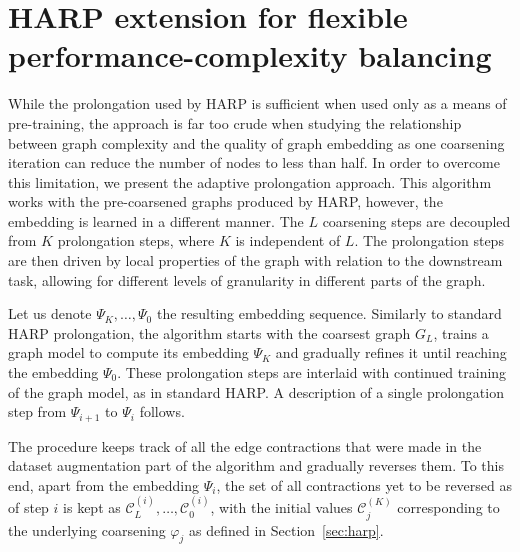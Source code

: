 \section{HARP extension for flexible performance-complexity balancing}\label{sec:our-method}

While the prolongation used by HARP is sufficient when used only as a means of pre-training, the approach is far too crude when studying the relationship between graph complexity and the quality of graph embedding as one coarsening iteration can reduce the number of nodes to less than half. In order to overcome this limitation, we present the adaptive prolongation approach. This algorithm works with the pre-coarsened graphs produced by HARP, however, the embedding is learned in a different manner. The \( L \) coarsening steps are decoupled from \( K \) prolongation steps, where \( K \) is independent of \( L \). The prolongation steps are then driven by local properties of the graph with relation to the downstream task, allowing for different levels of granularity in different parts of the graph.

Let us denote \( \Psi_K, \dots, \Psi_0 \) the resulting embedding sequence. Similarly to standard HARP prolongation, the algorithm starts with the coarsest graph \( G_L \), trains a graph model to compute its embedding \( \Psi_K \) and gradually refines it until reaching the embedding \( \Psi_0 \). These prolongation steps are interlaid with continued training of the graph model, as in standard HARP. A description of a single prolongation step from \( \Psi_{i + 1} \) to \( \Psi_i \) follows.

The procedure keeps track of all the edge contractions that were made in the dataset augmentation part of the algorithm and gradually reverses them. To this end, apart from the embedding \( \Psi_i \), the set of all contractions yet to be reversed as of step \( i \) is kept as \( \mathcal{C}_L^{(i)}, \dots, \mathcal{C}_0^{(i)} \), with the initial values \( \mathcal{C}_j^{(K)} \) corresponding to the underlying coarsening \( \varphi_j \) as defined in Section~\ref{sec:harp}.

